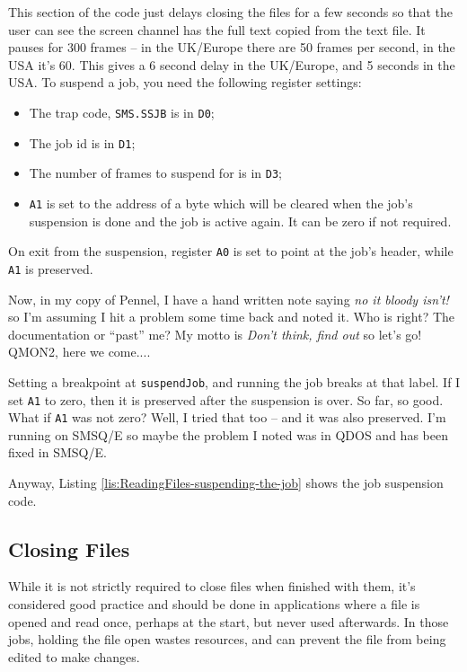 This section of the code just delays closing the files for a few seconds
so that the user can see the screen channel has the full text copied
from the text file. It pauses for 300 frames -- in the UK/Europe
there are 50 frames per second, in the USA it's 60. This gives a 6
second delay in the UK/Europe, and 5 seconds in the USA. To suspend
a job, you need the following register settings:
\begin{itemize}
\item The trap code, \texttt{SMS.SSJB} is in \texttt{D0};
\item The job id is in \texttt{D1};
\item The number of frames to suspend for is in \texttt{D3};
\item \texttt{A1} is set to the address of a byte which will be cleared
when the job's suspension is done and the job is active again. It
can be zero if not required.
\end{itemize}
On exit from the suspension, register \texttt{A0} is set to point
at the job's header, while \texttt{A1} is preserved. 

Now, in my copy of Pennel, I have a hand written note saying \emph{no
it bloody isn't!} so I'm assuming I hit a problem some time back and
noted it. Who is right? The documentation or ``past'' me? My motto
is \emph{Don't think, find out} so let's go! QMON2, here we come....

Setting a breakpoint at \texttt{suspendJob}, and running the job breaks
at that label. If I set \texttt{A1} to zero, then it is preserved
after the suspension is over. So far, so good. What if \texttt{A1}
was not zero? Well, I tried that too -- and it was also preserved.
I'm running on SMSQ/E so maybe the problem I noted was in QDOS and
has been fixed in SMSQ/E. 

Anyway, Listing \ref{lis:ReadingFiles-suspending-the-job} shows the
job suspension code.



\subsection{Closing Files}

While it is not strictly required to close files when finished with
them, it's considered good practice and should be done in applications
where a file is opened and read once, perhaps at the start, but never
used afterwards. In those jobs, holding the file open wastes resources,
and can prevent the file from being edited to make changes. 

